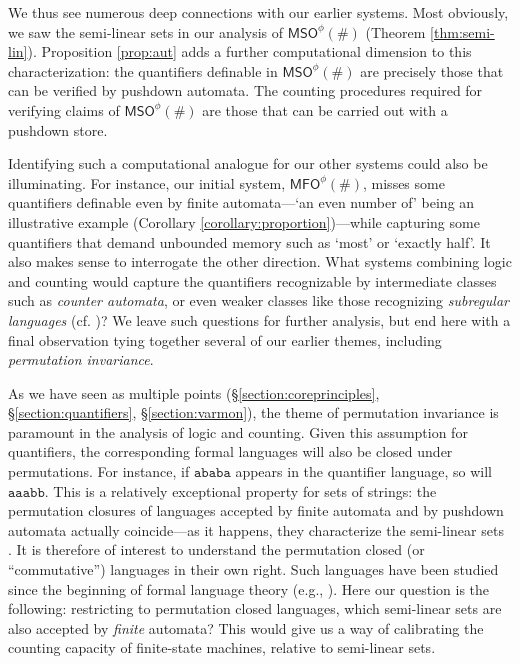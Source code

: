 \documentclass[12pt,oneside,reqno]{amsart}
\theoremstyle{definition}
\begin{document}
We thus see numerous deep connections with our earlier systems. Most obviously, we saw the semi-linear sets in our analysis of $\mathsf{MSO}^\phi(\#)$ (Theorem \ref{thm:semi-lin}). Proposition \ref{prop:aut} adds a further computational dimension to this characterization: the quantifiers definable in $\mathsf{MSO}^\phi(\#)$ are precisely those that can be verified by pushdown automata. The counting procedures required for verifying claims of $\mathsf{MSO}^\phi(\#)$ are those that can be carried out with a pushdown store. 

Identifying such a computational analogue for our other systems could also be illuminating. For instance, our initial system, $\mathsf{MFO}^\phi(\#)$, misses some quantifiers definable even  by finite automata---`an even number of' being an illustrative example (Corollary \ref{corollary:proportion})---while capturing some  quantifiers that demand unbounded memory such as `most' or `exactly half'. It also makes sense to interrogate the other direction. What systems combining logic and counting would capture the quantifiers recognizable by intermediate classes such as \emph{counter automata}, or even weaker classes like those recognizing \emph{subregular languages} (cf. \citealt{Graf})? We leave such questions for further analysis, but end here with a final observation tying together several of our earlier themes, including \emph{permutation invariance}. 

As we have seen as multiple points (\S\ref{section:coreprinciples}, \S \ref{section:quantifiers}, \S\ref{section:varmon}), the theme of permutation invariance is paramount in the analysis of logic and counting. Given this assumption for quantifiers, the corresponding formal languages will also be closed under permutations. For instance, if $\mathtt{ababa}$ appears in the quantifier language, so will $\mathtt{aaabb}$. This is a relatively exceptional property for sets of strings:  the permutation closures of languages accepted by finite automata and by pushdown automata actually coincide---as it happens, they characterize the semi-linear sets \citep{Parikh}. 
It is therefore of interest to understand the permutation closed (or ``commutative'') languages in their own right. Such languages have been studied since the beginning of formal language theory (e.g., \citealt{Eilenberg}). Here our question is the following: restricting to permutation closed languages, which semi-linear sets are also accepted by \emph{finite} automata? This would give us a way of calibrating the counting capacity of finite-state machines, relative to semi-linear sets. 
\end{document}
